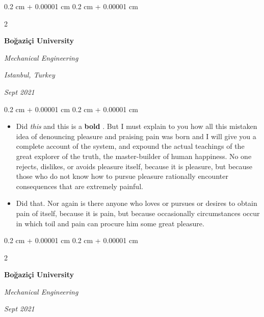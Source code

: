 \documentclass[10pt, letterpaper]{article}
\newenvironment{highlights}{
    \begin{itemize}[
        topsep=0.10 cm,
        parsep=0.10 cm,
        partopsep=0pt,
        itemsep=0pt,
        leftmargin=0.4 cm + 10pt
    ]
}{
    \end{itemize}
} %
\newenvironment{onecolentry}{
    \begin{adjustwidth}{
        0.2 cm + 0.00001 cm
    }{
        0.2 cm + 0.00001 cm
    }
}{
    \end{adjustwidth}
} %
\newenvironment{twocolentry}[2][]{
    \onecolentry
    \def\secondColumn{#2}
    \setcolumnwidth{\fill, 4.5 cm}
    \begin{paracol}{2}
}{
    \switchcolumn \raggedleft \secondColumn
    \end{paracol}
    \endonecolentry
} %
\let\hrefWithoutArrow\href
\renewcommand{\href}[2]{\hrefWithoutArrow{#1}{\ifthenelse{\equal{#2}{}}{ }{#2 }\raisebox{.15ex}{\footnotesize \faExternalLink*}}}
\begin{document}
        \vspace{0.2 cm}

        \begin{twocolentry}{
        \textit{Istanbul, Turkey}    
            
        \textit{Sept 2021}}
            \textbf{Boğaziçi University}

            \textit{Mechanical Engineering}
        \end{twocolentry}

        \vspace{0.10 cm}
        \begin{onecolentry}
            \begin{highlights}
                \item Did \textit{this} and this is a \textbf{bold} \href{https://example.com}{link}. But I must explain to you how all this mistaken idea of denouncing pleasure and praising pain was born and I will give you a complete account of the system, and expound the actual teachings of the great explorer of the truth, the master-builder of human happiness. No one rejects, dislikes, or avoids pleasure itself, because it is pleasure, but because those who do not know how to pursue pleasure rationally encounter consequences that are extremely painful.
                \item Did that. Nor again is there anyone who loves or pursues or desires to obtain pain of itself, because it is pain, but because occasionally circumstances occur in which toil and pain can procure him some great pleasure.
            \end{highlights}
        \end{onecolentry}


        \vspace{0.2 cm}

        \begin{twocolentry}{
            
            
        \textit{Sept 2021}}
            \textbf{Boğaziçi University}

            \textit{Mechanical Engineering}
        \end{twocolentry}
\end{document}

